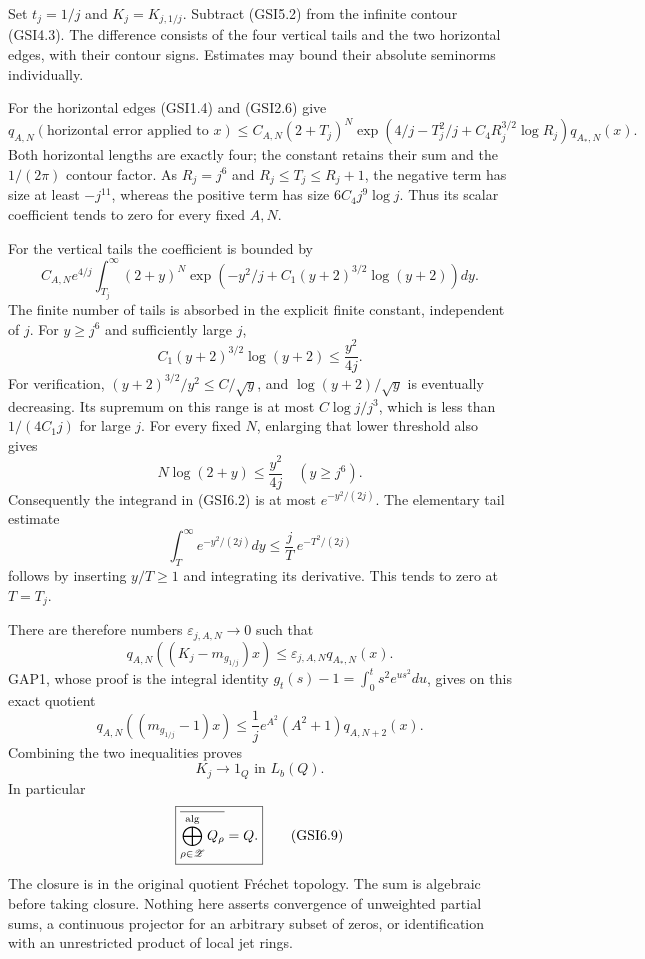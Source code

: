 Set \(t_j=1/j\) and \(K_j=K_{j,1/j}\). Subtract (GSI5.2) from the
infinite contour (GSI4.3). The difference consists of the four vertical
tails and the two horizontal edges, with their contour signs. Estimates
may bound their absolute seminorms individually.

For the horizontal edges (GSI1.4) and (GSI2.6) give \[
q_{A,N}(\text{horizontal error applied to }x)
\le C_{A,N}(2+T_j)^N
\exp\left(4/j-T_j^2/j+C_4R_j^{3/2}\log R_j\right)
q_{A_*,N}(x).
\tag{GSI6.1}
\] Both horizontal lengths are exactly four; the constant retains their
sum and the \(1/(2\pi)\) contour factor. As \(R_j=j^6\) and
\(R_j\le T_j\le R_j+1\), the negative term has size at least
\(-j^{11}\), whereas the positive term has size \(6C_4j^9\log j\). Thus
its scalar coefficient tends to zero for every fixed \(A,N\).

For the vertical tails the coefficient is bounded by \[
C_{A,N}e^{4/j}\int_{T_j}^{\infty}
(2+y)^N\exp\left(-y^2/j+C_1(y+2)^{3/2}\log(y+2)\right)dy.
\tag{GSI6.2}
\] The finite number of tails is absorbed in the explicit finite
constant, independent of \(j\). For \(y\ge j^6\) and sufficiently large
\(j\), \[
C_1(y+2)^{3/2}\log(y+2)\le\frac{y^2}{4j}.
\tag{GSI6.3}
\] For verification, \((y+2)^{3/2}/y^2\le C/\sqrt y\), and
\(\log(y+2)/\sqrt y\) is eventually decreasing. Its supremum on this
range is at most \(C\log j/j^3\), which is less than \(1/(4C_1j)\) for
large \(j\). For every fixed \(N\), enlarging that lower threshold also
gives \[
N\log(2+y)\le\frac{y^2}{4j}\quad(y\ge j^6).
\tag{GSI6.4}
\] Consequently the integrand in (GSI6.2) is at most \(e^{-y^2/(2j)}\).
The elementary tail estimate \[
\int_T^\infty e^{-y^2/(2j)}dy
\le\frac jT\,e^{-T^2/(2j)}
\tag{GSI6.5}
\] follows by inserting \(y/T\ge1\) and integrating its derivative. This
tends to zero at \(T=T_j\).

There are therefore numbers \(\varepsilon_{j,A,N}\to0\) such that \[
q_{A,N}((K_j-m_{g_{1/j}})x)
\le\varepsilon_{j,A,N}q_{A_*,N}(x).
\tag{GSI6.6}
\] GAP1, whose proof is the integral identity
\(g_t(s)-1=\int_0^t s^2e^{us^2}du\), gives on this exact quotient \[
q_{A,N}((m_{g_{1/j}}-1)x)
\le\frac1j e^{A^2}(A^2+1)q_{A,N+2}(x).
\tag{GSI6.7}
\] Combining the two inequalities proves \[
\boxed{K_j\longrightarrow1_Q\text{ in }L_b(Q).}
\tag{GSI6.8}
\] In particular \[
\boxed{\overline{\bigoplus_{\rho\in\mathscr Z}^{\rm alg}Q_\rho}=Q.}
\tag{GSI6.9}
\] The closure is in the original quotient Fréchet topology. The sum is
algebraic before taking closure. Nothing here asserts convergence of
unweighted partial sums, a continuous projector for an arbitrary subset
of zeros, or identification with an unrestricted product of local jet
rings.

